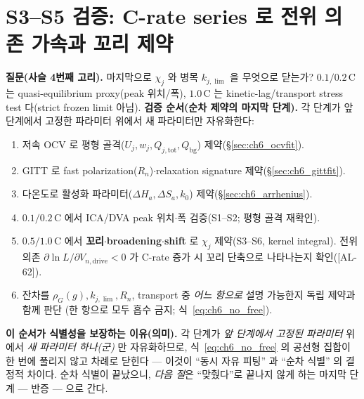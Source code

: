 \documentclass[11pt,a4paper]{article}
\newcommand{\drive}{\mathrm{drive}}
\newcommand{\bg}{\mathrm{bg}}
\newcommand{\tot}{\mathrm{tot}}
\newcommand{\AL}[1]{\textsf{[AL-#1]}}
\begin{document}
\section{S3--S5 검증: C-rate series 로 전위 의존 가속과 꼬리 제약}\label{sec:ch6_crate}
\textbf{질문(사슬 4번째 고리).} 마지막으로 $\chi_j$ 와 병목 $k_{j,\lim}$ 을 무엇으로 닫는가? $0.1/0.2\,\mathrm C$ 는
quasi-equilibrium proxy(peak 위치/폭), $1.0\,\mathrm C$ 는 kinetic-lag/transport stress test 다(strict frozen limit
아님). \textbf{검증 순서(순차 제약의 마지막 단계).} 각 단계가 앞 단계에서 고정한 파라미터 위에서 새 파라미터만
자유화한다:
\begin{enumerate}[label=C\arabic*),leftmargin=2.4em]
\item 저속 OCV 로 평형 골격($U_j,w_j,Q_{j,\tot},Q_\bg$) 제약(\S\ref{sec:ch6_ocvfit}).
\item GITT 로 fast polarization($R_n$)$\cdot$relaxation signature 제약(\S\ref{sec:ch6_gittfit}).
\item 다온도로 활성화 파라미터($\Delta H_a,\Delta S_a,k_0$) 제약(\S\ref{sec:ch6_arrhenius}).
\item $0.1/0.2\,\mathrm C$ 에서 ICA/DVA peak 위치$\cdot$폭 검증(S1--S2; 평형 골격 재확인).
\item $0.5/1.0\,\mathrm C$ 에서 \textbf{꼬리$\cdot$broadening$\cdot$shift} 로 $\chi_j$ 제약(S3--S6, kernel integral).
  전위 의존 $\partial\ln L/\partial V_{n,\drive}<0$ 가 C-rate 증가 시 꼬리 단축으로 나타나는지 확인(\AL{62}).
\item 잔차를 $\rho_G(g),k_{j,\lim},R_n$, transport 중 \emph{어느 항으로} 설명 가능한지 독립 제약과 함께 판단
  (한 항으로 모두 흡수 금지; 식~\eqref{eq:ch6_no_free}).
\end{enumerate}
\textbf{이 순서가 식별성을 보장하는 이유(의미).} 각 단계가 \emph{앞 단계에서 고정된 파라미터} 위에서 \emph{새 파라미터
하나(군)} 만 자유화하므로, 식~\eqref{eq:ch6_no_free} 의 공선형 집합이 한 번에 풀리지 않고 차례로 닫힌다 — 이것이
``동시 자유 피팅'' 과 ``순차 식별'' 의 결정적 차이다. 순차 식별이 끝났으니, \emph{다음 절}은 ``맞췄다''로 끝나지
않게 하는 마지막 단계 — 반증 — 으로 간다.

\end{document}
